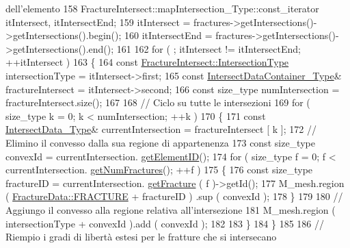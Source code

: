 \begin{DoxyCode}
{       dell'elemento}
158         FractureIntersect::mapIntersection\_Type::const\_iterator itIntersect, itIntersectEnd;
159         itIntersect = fractures->getIntersections()->getIntersections().begin();
160         itIntersectEnd = fractures->getIntersections()->getIntersections().end();
161         
162         \textcolor{keywordflow}{for} ( ; itIntersect != itIntersectEnd; ++itIntersect )
163         \{
164                 \textcolor{keyword}{const} \hyperlink{classFractureIntersect_a9a4e4a784fa4c8e359767ed543f89dc5}{FractureIntersect::IntersectionType} 
      intersectionType = itIntersect->first;
165                 \textcolor{keyword}{const} \hyperlink{IntersectData_8h_a822ec3b760dfb603e1cf0bfe3ad5636a}{IntersectDataContainer\_Type}& fractureIntersect = 
      itIntersect->second;
166                 \textcolor{keyword}{const} size\_type numIntersection = fractureIntersect.size();
167 
168                 \textcolor{comment}{// Ciclo su tutte le intersezioni}
169                 \textcolor{keywordflow}{for} ( size\_type k = 0; k < numIntersection; ++k )
170                 \{
171                         \textcolor{keyword}{const} \hyperlink{classIntersectData}{IntersectData\_Type}& currentIntersection = fractureIntersect
       [ k ];
172                         \textcolor{comment}{// Elimino il convesso dalla sua regione di appartenenza}
173                         \textcolor{keyword}{const} size\_type convexId = currentIntersection.
      \hyperlink{classIntersectData_a1872122295e3fec0fb3e81d4098e9949}{getElementID}();
174                         \textcolor{keywordflow}{for} ( size\_type f = 0; f < currentIntersection.
      \hyperlink{classIntersectData_a25def82d58f9508d33ab1a43b2b03ceb}{getNumFractures}(); ++f )
175                         \{
176                                 \textcolor{keyword}{const} size\_type fractureID = currentIntersection.
      \hyperlink{classIntersectData_afef7730d6a494464350ebce088e488ee}{getFracture} ( f )->getId();
177                                 M\_mesh.region ( \hyperlink{classFractureData_aaeea1f30482432d159eda9d98beb5e89a351538e4c78b34b5c0416e21903e1812}{FractureData::FRACTURE} + fractureID )
      .sup ( convexId );
178                         \}
179 
180                         \textcolor{comment}{// Aggiungo il convesso alla regione relativa all'intersezione}
181                         M\_mesh.region ( intersectionType + convexId ).add ( convexId );
182 
183                 \}
184         \}
185 
186         \textcolor{comment}{// Riempio i gradi di libertà estesi per le fratture che si intersecano}

\end{DoxyCode}
